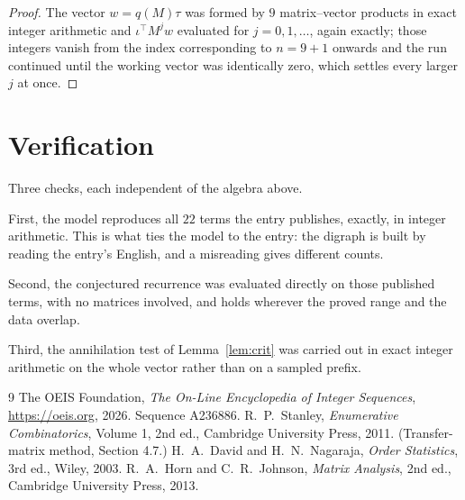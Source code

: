 \documentclass[11pt,a4paper]{article}
\theoremstyle{plain}
\theoremstyle{definition}
\begin{document}
\begin{proof}
The vector $w=q(M)\tau$ was formed by $9$ matrix--vector products in exact integer
arithmetic and $\iota^{\!\top}M^{j}w$ evaluated for $j=0,1,\dots$, again exactly; those
integers vanish from the index corresponding to $n=9+1$ onwards and the run continued
until the working vector was identically zero, which settles every larger $j$ at once.
\end{proof}

\section{Verification}

Three checks, each independent of the algebra above.

First, the model reproduces all $22$ terms the entry publishes, exactly, in integer
arithmetic. This is what ties the model to the entry: the digraph is built by reading the
entry's English, and a misreading gives different counts.

Second, the conjectured recurrence was evaluated directly on those published terms, with no
matrices involved, and holds wherever the proved range and the data overlap.

Third, the annihilation test of Lemma~\ref{lem:crit} was carried out in exact integer
arithmetic on the whole vector rather than on a sampled prefix.

\begin{thebibliography}{9}
 The OEIS Foundation, \emph{The On-Line Encyclopedia of Integer
Sequences}, \url{https://oeis.org}, 2026. Sequence A236886.
 R.~P.~Stanley, \emph{Enumerative Combinatorics}, Volume 1, 2nd ed.,
Cambridge University Press, 2011. (Transfer-matrix method, Section 4.7.)
 H.~A.~David and H.~N.~Nagaraja, \emph{Order Statistics}, 3rd ed., Wiley,
2003.
 R.~A.~Horn and C.~R.~Johnson, \emph{Matrix Analysis}, 2nd ed., Cambridge
University Press, 2013.
\end{thebibliography}
\end{document}
